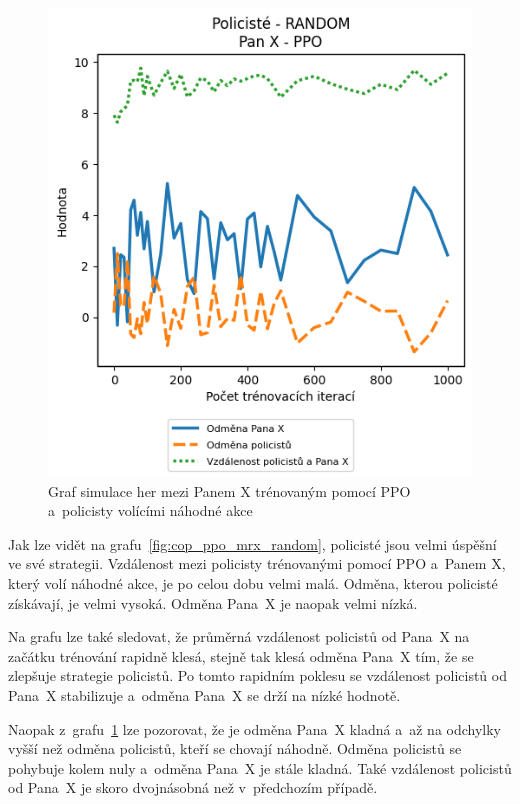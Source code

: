 \begin{figure}[H]
\begin{minipage}{.48\textwidth}
    \includegraphics[width=1\textwidth]{obrazky-figures/graphs/cop_RANDOM_mrx_PPO}
      \caption{Graf simulace her mezi Panem X trénovaným pomocí PPO a~policisty volícími náhodné akce}
      \label{fig:cop_random_mrx_ppo}
  \end{minipage}
  \end{figure}

Jak lze vidět na grafu~\ref{fig:cop_ppo_mrx_random}, policisté jsou velmi úspěšní ve své strategii.
Vzdálenost mezi policisty trénovanými pomocí PPO a~Panem X, který volí náhodné akce, je po celou dobu velmi malá.
Odměna, kterou policisté získávají, je velmi vysoká.
Odměna Pana~X je naopak velmi nízká.

Na grafu lze také sledovat, že průměrná vzdálenost policistů od Pana~X na začátku trénování rapidně klesá, stejně tak klesá odměna Pana~X tím, že se zlepšuje strategie policistů.
Po tomto rapidním poklesu se vzdálenost policistů od Pana~X stabilizuje a~odměna Pana~X se drží na nízké hodnotě.

Naopak z~grafu~\ref{fig:cop_random_mrx_ppo} lze pozorovat, že je odměna Pana~X kladná a~až na odchylky vyšší než odměna policistů, kteří se chovají náhodně.
Odměna policistů se pohybuje kolem nuly a~odměna Pana~X je stále kladná.
Také vzdálenost policistů od Pana~X je skoro dvojnásobná než v~předchozím případě.

